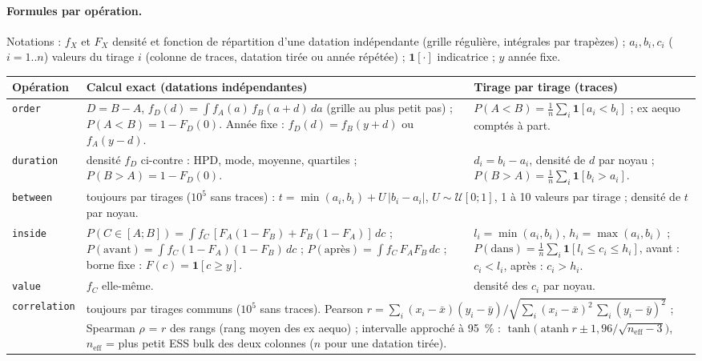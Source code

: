 \documentclass[11pt,a4paper]{article}
\newcommand{\code}[1]{\texttt{\small #1}}
\begin{document}
\paragraph{Formules par opération.} Notations : $f_X$ et $F_X$ densité et fonction de répartition d'une datation
indépendante (grille régulière, intégrales par trapèzes) ; $a_i, b_i, c_i$ ($i=1..n$) valeurs du tirage $i$ (colonne de
traces, datation tirée ou année répétée) ; $\mathbf 1[\cdot]$ indicatrice ; $y$ année fixe.
\begin{center}\small
\renewcommand{\arraystretch}{1.35}
\begin{tabularx}{\textwidth}{@{}p{2.1cm} X X@{}}
\toprule
\textbf{Opération} & \textbf{Calcul exact (datations indépendantes)} & \textbf{Tirage par tirage (traces)} \\ \midrule
\code{order} &
  $D=B-A$, $f_D(d)=\int f_A(a)\,f_B(a+d)\,da$ (grille au plus petit pas) ; $P(A<B)=1-F_D(0)$. Année fixe :
  $f_D(d)=f_B(y+d)$ ou $f_A(y-d)$. &
  $P(A<B)=\frac1n\sum_i \mathbf 1[a_i<b_i]$ ; ex aequo comptés à part. \\
\code{duration} &
  densité $f_D$ ci-contre : HPD, mode, moyenne, quartiles ; $P(B>A)=1-F_D(0)$. &
  $d_i=b_i-a_i$, densité de $d$ par noyau ; $P(B>A)=\frac1n\sum_i\mathbf 1[b_i>a_i]$. \\
\code{between} &
  \multicolumn{2}{p{\dimexpr\textwidth-2.1cm-4\tabcolsep\relax}}{toujours par tirages ($10^5$ sans traces) :
  $t=\min(a_i,b_i)+U\,|b_i-a_i|$, $U\sim\mathcal U[0;1]$, 1 à 10 valeurs par tirage ; densité de $t$ par noyau.} \\
\code{inside} &
  $P(C\in[A;B])=\int f_C\,[F_A(1-F_B)+F_B(1-F_A)]\,dc$ ; $P(\text{avant})=\int f_C(1-F_A)(1-F_B)\,dc$ ;
  $P(\text{après})=\int f_C\,F_AF_B\,dc$ ; borne fixe : $F(c)=\mathbf 1[c\ge y]$. &
  $l_i=\min(a_i,b_i)$, $h_i=\max(a_i,b_i)$ ; $P(\text{dans})=\frac1n\sum_i\mathbf 1[l_i\le c_i\le h_i]$, avant :
  $c_i<l_i$, après : $c_i>h_i$. \\
\code{value} & $f_C$ elle-même. & densité des $c_i$ par noyau. \\
\code{correlation} &
  \multicolumn{2}{p{\dimexpr\textwidth-2.1cm-4\tabcolsep\relax}}{toujours par tirages communs ($10^5$ sans traces). Pearson
  $r=\sum_i(x_i-\bar x)(y_i-\bar y)\big/\sqrt{\sum_i(x_i-\bar x)^2\,\sum_i(y_i-\bar y)^2}$ ; Spearman $\rho$ = $r$ des
  rangs (rang moyen des ex aequo) ; intervalle approché à 95~\% : $\tanh\!\big(\operatorname{atanh} r\pm
  1{,}96/\sqrt{n_{\text{eff}}-3}\big)$, $n_{\text{eff}}$ = plus petit ESS bulk des deux colonnes ($n$ pour une datation
  tirée).} \\
\bottomrule
\end{tabularx}
\end{center}
\end{document}
